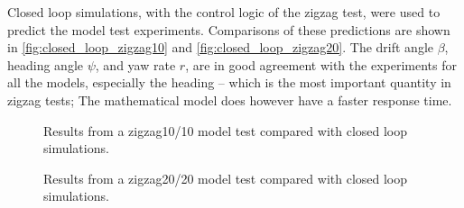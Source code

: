 Closed loop simulations, with the control logic of the zigzag test, were used to predict the model test experiments. Comparisons of these predictions are shown in \autoref{fig:closed_loop_zigzag10} and \autoref{fig:closed_loop_zigzag20}. The drift angle $\beta$, heading angle $\psi$, and yaw rate $r$, are in good agreement with the experiments for all the models, especially the heading -- which is the most important quantity in zigzag tests; The mathematical model does however have a faster response time.
\begin{figure}[h]
    \centering
    
    \caption{Results from a zigzag10/10 model test compared with closed loop simulations.}
    \label{fig:closed_loop_zigzag10}
\end{figure}
\begin{figure}[h]
    \centering
    
    \caption{Results from a zigzag20/20 model test compared with closed loop simulations.}
    \label{fig:closed_loop_zigzag20}
\end{figure}

